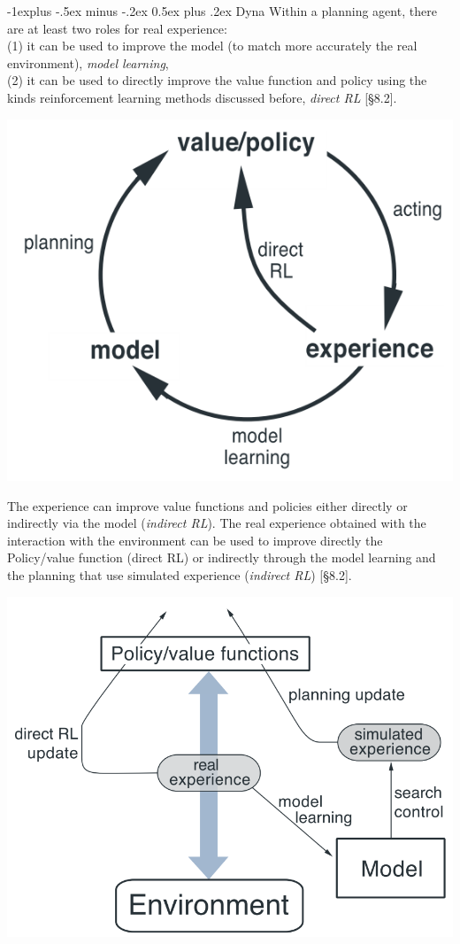 \documentclass[10pt,landscape]{article}
\makeatletter
\renewcommand{\subsection}{\@startsection{subsection}{2}{0mm}%
                                {-1explus -.5ex minus -.2ex}%
                                {0.5ex plus .2ex}%
                                {\normalfont\normalsize\bfseries}}
\makeatother
\begin{document}
\begin{multicols}{3}
\subsection{Dyna}
Within a planning agent, there are at least two roles for real experience: \\
(1) it can be used to improve the model (to match more accurately the real environment), \emph{model learning},\\ 
(2) it can be used to directly improve the value function and policy using the kinds reinforcement learning methods discussed before, \emph{direct RL} [§8.2].\\
\begin{center}
\includegraphics[width=0.6\linewidth]{./images/Planning-Learning.png}
\end{center}
The experience can improve value functions and policies either directly or indirectly via the model (\emph{indirect RL}).
The real experience obtained with the interaction with the environment can be used to improve directly the Policy/value function (direct RL) or indirectly through the model learning and the planning that use simulated experience (\emph{indirect RL}) [§8.2].\\
\begin{center}
\includegraphics[width=0.8\linewidth]{./images/Dyna.png}
\end{center}


\end{multicols}
\end{document}

